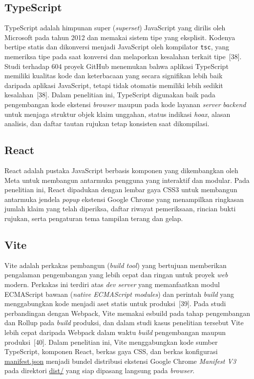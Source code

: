 \documentclass[12pt,a4paper,twoside]{report}
\begin{document}
\subsection{TypeScript}

TypeScript adalah himpunan super (\textit{superset}) JavaScript yang dirilis oleh Microsoft pada tahun 2012 dan memakai sistem tipe yang eksplisit. Kodenya bertipe statis dan dikonversi menjadi JavaScript oleh kompilator \texttt{tsc}, yang memeriksa tipe pada saat konversi dan melaporkan kesalahan terkait tipe~[38]. Studi terhadap 604 proyek GitHub menemukan bahwa aplikasi TypeScript memiliki kualitas kode dan keterbacaan yang secara signifikan lebih baik daripada aplikasi JavaScript, tetapi tidak otomatis memiliki lebih sedikit kesalahan~[38]. Dalam penelitian ini, TypeScript digunakan baik pada pengembangan kode ekstensi \textit{browser} maupun pada kode layanan \textit{server} \textit{backend} untuk menjaga struktur objek klaim unggahan, status indikasi \textit{hoax}, alasan analisis, dan daftar tautan rujukan tetap konsisten saat dikompilasi.

\subsection{React}

React adalah pustaka JavaScript berbasis komponen yang dikembangkan oleh Meta untuk membangun antarmuka pengguna yang interaktif dan modular. Pada penelitian ini, React dipadukan dengan lembar gaya CSS3 untuk membangun antarmuka jendela \textit{popup} ekstensi Google Chrome yang menampilkan ringkasan jumlah klaim yang telah diperiksa, daftar riwayat pemeriksaan, rincian bukti rujukan, serta pengaturan tema tampilan terang dan gelap.

\subsection{Vite}

Vite adalah perkakas pembangun (\textit{build tool}) yang bertujuan memberikan pengalaman pengembangan yang lebih cepat dan ringan untuk proyek \textit{web} modern. Perkakas ini terdiri atas \textit{dev server} yang memanfaatkan modul ECMAScript bawaan (\textit{native ECMAScript modules}) dan perintah \textit{build} yang menggabungkan kode menjadi aset statis untuk produksi~[39]. Pada studi perbandingan dengan Webpack, Vite memakai esbuild pada tahap pengembangan dan Rollup pada \textit{build} produksi, dan dalam studi kasus penelitian tersebut Vite lebih cepat daripada Webpack dalam waktu \textit{build} pengembangan maupun produksi~[40]. Dalam penelitian ini, Vite menggabungkan kode sumber TypeScript, komponen React, berkas gaya CSS, dan berkas konfigurasi \url{manifest.json} menjadi bundel distribusi ekstensi Google Chrome \textit{Manifest V3} pada direktori \url{dist/} yang siap dipasang langsung pada \textit{browser}.
\end{document}
